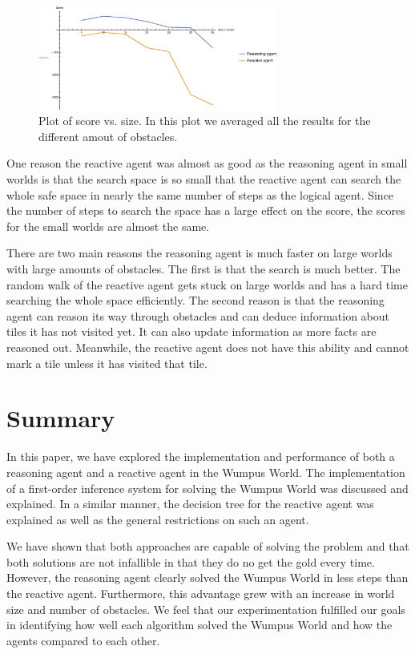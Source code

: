 \documentclass{article}
\begin{document}
		\begin{figure}[h!]
			\centering
			\includegraphics[width=0.7\textwidth]{images/2dplot}
			\caption{Plot of score vs. size. In this plot we averaged all the results for the different amout of obstacles.}
		\end{figure}
		
		One reason the reactive agent was almost as good as the reasoning agent in small worlds is that the search space is so small that the reactive agent can search the whole safe space in nearly the same number of steps as the logical agent.
	 Since the number of steps to search the space has a large effect on the score, the scores for the small worlds are almost the same. 
		
		There are two main reasons the reasoning agent is much faster on large worlds with large amounts of obstacles.
		 The first is that the search is much better.
		  The random walk of the reactive agent gets stuck on large worlds and has a hard time searching the whole space efficiently.
		   The second reason is that the reasoning agent can reason its way through obstacles and can deduce information about tiles it has not visited yet.
		    It can also update information as more facts are reasoned out.
		     Meanwhile, the reactive agent does not have this ability and cannot mark a tile unless it has visited that tile.
	
\section{Summary}
In this paper, we have explored the implementation and performance of both a reasoning agent and a reactive agent in the Wumpus World. The implementation of a first-order inference system for solving the Wumpus World was discussed and explained. In a similar manner, the decision tree for the reactive agent was explained as well as the general restrictions on such an agent.

We have shown that both approaches are capable of solving the problem and that both solutions are not infallible in that they do no get the gold every time. However, the reasoning agent clearly solved the Wumpus World in less steps than the reactive agent. Furthermore, this advantage grew with an increase in world size and number of obstacles. We feel that our experimentation fulfilled our goals in identifying how well each algorithm solved the Wumpus World and how the agents compared to each other.


	

	\pagebreak


	
	
	
\end{document}
